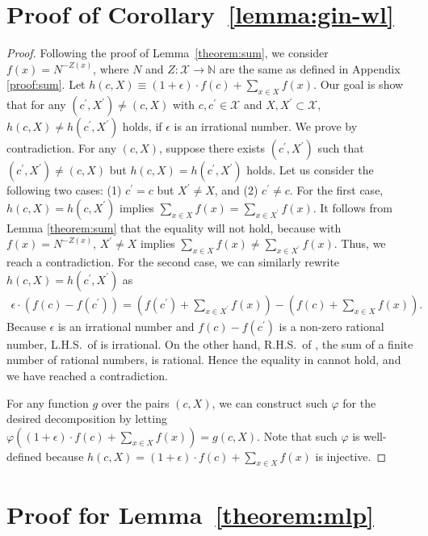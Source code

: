 \begin{appendix}
\section{Proof of Corollary~\ref{lemma:gin-wl}}
\begin{proof}
Following the proof of Lemma~\ref{theorem:sum}, we consider $f(x) =N^{-Z(x)}$, where $N$ and $Z: \mathcal{X} \rightarrow \mathbb{N}$ are the same as defined in Appendix \ref{proof:sum}. Let $h(c, X) \equiv (1 + \epsilon)\cdot f(c) + \sum_{x \in X} f(x)$. Our goal is show that for any $(c^{\prime}, X^{\prime}) \neq (c, X) $ with $c, c^{\prime} \in \mathcal{X}$ and $X, X^{\prime} \subset \mathcal{X}$, $h(c, X) \neq h(c^{\prime}, X^{\prime})$ holds, if $\epsilon$ is an irrational number. We prove by contradiction. For any $(c, X)$, suppose there exists $(c^{\prime}, X^{\prime})$ such that $(c^{\prime}, X^{\prime})\neq (c, X)$ but $h(c, X) = h(c^{\prime}, X^{\prime})$ holds. Let us consider the following two cases: (1) $c^{\prime} = c$ but $X^{\prime} \neq X$, and (2) $c^{\prime} \neq c$. For the first case, $h(c, X) = h(c, X^{\prime})$ implies $\sum_{x \in X} f(x) = \sum_{x \in X^{\prime}} f(x)$. It follows from Lemma \ref{theorem:sum} that the equality will not hold, because with $f(x) =N^{-Z(x)}$, $X^{\prime} \neq X$ implies $\sum_{x \in X} f(x) \neq \sum_{x \in X^{\prime}} f(x)$. Thus, we reach a contradiction. For the second case, we can similarly rewrite $h(c, X) = h(c^{\prime}, X^{\prime})$  as
\begin{align}
\label{eq:rewrite}
\epsilon \cdot \left(f(c) - f(c^{\prime}) \right) = \left( f(c^{\prime}) + \sum_{x \in X^{\prime}} f(x) \right) - \left( f(c) + \sum_{x \in X} f(x) \right).
\end{align}
Because $\epsilon$ is an irrational number and $f(c) - f(c^{\prime})$ is a non-zero rational number, L.H.S.~of  is irrational. On the other hand, R.H.S.~of , the sum of a finite number of rational numbers, is rational. Hence the equality in  cannot hold, and we have reached a contradiction.

For any function $g$ over the pairs $(c, X)$, we can construct such $\varphi$ for the desired decomposition by letting $\varphi \left( (1 + \epsilon)\cdot f(c) + \sum_{x \in X} f(x) \right) = g(c, X)$. Note that such $\varphi$ is well-defined because $h(c, X) = (1 + \epsilon)\cdot f(c) + \sum_{x \in X} f(x)$ is injective. 
\end{proof}


\section{Proof for Lemma~\ref{theorem:mlp}}



\end{appendix}
